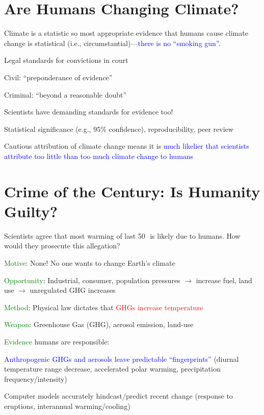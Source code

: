 \documentclass[12pt]{article}
\begin{document}
\section{Are Humans Changing Climate?}
Climate is a statistic so most appropriate evidence that humans cause
climate change is statistical (i.e.,
circumstantial)---\textcolor{blue}{there is no ``smoking gun''}.   
\begin{itemize*}
\item Legal standards for convictions in court
\begin{itemize*} 
\item Civil: ``preponderance of evidence''
\item Criminal: ``beyond a reasonable doubt'' 
\end{itemize*}
\item Scientists have demanding standards for evidence too!
\begin{itemize*}
\item Statistical significance (e.g., 95\% confidence),
  reproducibility, peer review  
\item Cautious attribution of climate change means it is
  \textcolor{blue}{much likelier that scientists attribute too little 
  than too much climate change to humans}
\end{itemize*}
\end{itemize*}

\section{Crime of the Century: Is Humanity Guilty?}
Scientists agree that most warming of last 50\,\yr\ is likely due to
humans.
How would they prosecute this allegation?
\begin{itemize*}
\item \textcolor{green}{Motive}: None! No one wants to change Earth's climate
\item \textcolor{green}{Opportunity}: Industrial, consumer, population
  pressures $\rightarrow$ increase fuel, land use $\rightarrow$
  unregulated GHG increases
\item \textcolor{green}{Method}: Physical law dictates that
  \textcolor{red}{GHGs increase temperature} 
\item \textcolor{green}{Weapon}: Greenhouse Gas (GHG), aerosol emission, land-use
\item \textcolor{green}{Evidence} humans are responsible:
\begin{itemize*}
 \item \textcolor{blue}{Anthropogenic GHGs and aerosols leave
  predictable ``fingerprints''} (diurnal temperature range decrease,
  accelerated polar warming, precipitation frequency/intensity)
\item Computer models accurately hindcast/predict recent change
  (response to eruptions, interannual warming/cooling)
\end{itemize*}
\end{itemize*}
\end{document}
